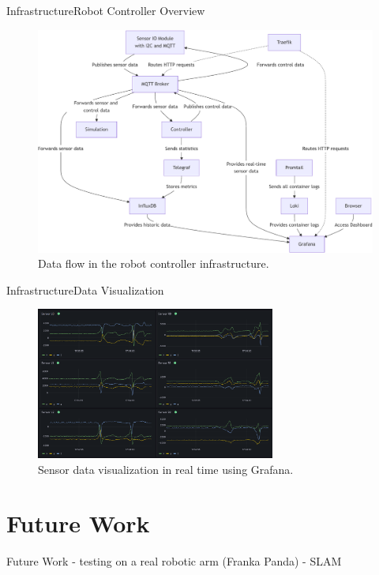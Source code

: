 \documentclass[AIRbeamer
,optEnglish
,optBiber
,optBibstyleAlphabetic
,optBeamerClassicFormat%
]{AIRlatex}
\begin{document}
    \begin{frame}{Infrastructure}{Robot Controller Overview}
        \begin{figure}[H]
            \centering
            \includegraphics[height=0.75\textheight]{figures/infrastructure-robot-controller}
            \caption{Data flow in the robot controller infrastructure.}
        \end{figure}
    \end{frame}

    \begin{frame}{Infrastructure}{Data Visualization}
        \begin{figure}[H]
            \centering
            \includegraphics[width=0.7\textwidth]{figures/grafana}
            \caption{Sensor data visualization in real time using Grafana.}
        \end{figure}
    \end{frame}


    \section{Future Work}
    \begin{frame}{Future Work}
        - testing on a real robotic arm (Franka Panda)
        - SLAM
    \end{frame}
\end{document}
